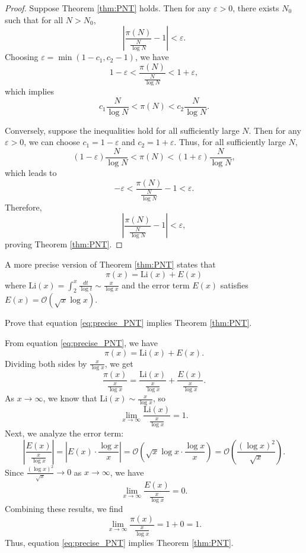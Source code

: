 \documentclass{elegantbook}
\begin{document}
\begin{proof}
  Suppose Theorem \ref{thm:PNT} holds. Then for any $\varepsilon > 0$, there exists $N_0$ such that for all $N > N_0$,
  \[
    \left| \frac{\pi(N)}{\frac{N}{\log N}} - 1 \right| < \varepsilon.
  \]
  Choosing $\varepsilon = \min(1 - c_1, c_2 - 1)$, we have
  \[
    1 - \varepsilon < \frac{\pi(N)}{\frac{N}{\log N}} < 1 + \varepsilon,
  \]
  which implies
  \[
    c_1 \frac{N}{\log N} < \pi(N) < c_2 \frac{N}{\log N}.
  \]

  Conversely, suppose the inequalities hold for all sufficiently large $N$. Then for any $\varepsilon > 0$, we can choose $c_1 = 1 - \varepsilon$ and $c_2 = 1 + \varepsilon$. Thus, for all sufficiently large $N$,
  \[
    (1 - \varepsilon) \frac{N}{\log N} < \pi(N) < (1 + \varepsilon) \frac{N}{\log N},
  \]
  which leads to
  \[
    -\varepsilon < \frac{\pi(N)}{\frac{N}{\log N}} - 1 < \varepsilon.
  \]
  Therefore,
  \[
    \left| \frac{\pi(N)}{\frac{N}{\log N}} - 1 \right| < \varepsilon,
  \]
  proving Theorem \ref{thm:PNT}.
\end{proof}

\begin{remark}
  A more precise version of Theorem \ref{thm:PNT} states that
  \begin{equation} \label{eq:precise_PNT}
    \pi(x) = \mathrm{Li}(x) + E(x)
  \end{equation}
  where $\mathrm{Li}(x) = \int_2^x \frac{dt}{\log t}\sim \frac{x}{\log x}$ and the error term $E(x)$ satisfies $E(x) = \mathcal{O}(\sqrt{x}\log x)$.
\end{remark}

\begin{exercise}
  Prove that equation \eqref{eq:precise_PNT} implies Theorem \ref{thm:PNT}.
\end{exercise}

\begin{solution}
  From equation \eqref{eq:precise_PNT}, we have
  \[
    \pi(x) = \mathrm{Li}(x) + E(x).
  \]
  Dividing both sides by $\frac{x}{\log x}$, we get
  \[
    \frac{\pi(x)}{\frac{x}{\log x}} = \frac{\mathrm{Li}(x)}{\frac{x}{\log x}} + \frac{E(x)}{\frac{x}{\log x}}.
  \]
  As $x \to \infty$, we know that $\mathrm{Li}(x) \sim \frac{x}{\log x}$, so
  \[
    \lim_{x \to \infty} \frac{\mathrm{Li}(x)}{\frac{x}{\log x}} = 1.
  \]
  Next, we analyze the error term:
  \[
    \left| \frac{E(x)}{\frac{x}{\log x}} \right| = \left| E(x) \cdot \frac{\log x}{x} \right| = \mathcal{O}\left( \sqrt{x} \log x \cdot \frac{\log x}{x} \right) = \mathcal{O}\left( \frac{(\log x)^2}{\sqrt{x}} \right).
  \]
  Since $\frac{(\log x)^2}{\sqrt{x}} \to 0$ as $x \to \infty$, we have
  \[
    \lim_{x \to \infty} \frac{E(x)}{\frac{x}{\log x}} = 0.
  \]
  Combining these results, we find
  \[
    \lim_{x \to \infty} \frac{\pi(x)}{\frac{x}{\log x}} = 1 + 0 = 1.
  \]
  Thus, equation \eqref{eq:precise_PNT} implies Theorem \ref{thm:PNT}.
\end{solution}
\end{document}
